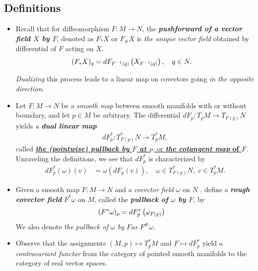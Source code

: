 \documentclass[11pt]{article}
\begin{document}
\subsection{Definitions}
\begin{itemize}
\item Recall that for diffeomorphism $F: M\rightarrow N$, the \emph{\textbf{pushforward of a vector field $X$ by $F$}}, denoted as $F_{*}X$ or $F_{\#}X$ is \emph{the unique vector field} obtained by differential of $F$ acting on $X$.  
\begin{align*}
(F_{*}X)_{q} &= dF_{F^{-1}(q)}\left(X_{F^{-1}(q)}\right), \quad q \in N.
\end{align*}

\emph{Dualizing} this process leads to a linear map on covectors going \emph{in the opposite direction}.

\item \begin{definition}
Let $F: M \rightarrow N$ be a \emph{smooth map} between smooth manifolds with or without boundary, and let $p \in M$ be arbitrary. The differential $dF_p: T_{p}M \rightarrow T_{F(p)}N$ yields \emph{a \textbf{dual linear map}}
\begin{align*}
dF_{p}^{*}:  T_{F(p)}^{*}N \rightarrow T_{p}^{*}M,
\end{align*} called \underline{\emph{\textbf{the (pointwise) pullback by $F$ at $p$}}, or \textbf{\emph{the cotangent map} of $F$}}. Unraveling
the definitions, we see that $dF_{p}^{*}$ is characterized by
\begin{align*}
dF_{p}^{*}(\omega)(v) &= \omega(dF_{p}(v)), \quad  \omega \in T_{F(p)}^{*}N, \; v \in T_{p}^{*}M.
\end{align*}
\end{definition}

\item \begin{definition}
Given a smooth map $F: M \rightarrow N$ and a \emph{covector field} $\omega$ on $N$ , define a \emph{\textbf{rough covector field}} $F^{*}\omega$ on $M$, called the
\textbf{\emph{pullback of $\omega$ by $F$}}, by
\begin{align*}
(F^{*}\omega)_p &= dF_{p}^{*}\left(\omega_{F(p)}\right)
\end{align*}  We also denote \emph{the pullback of $\omega$ by $F$as $F^{\#}\omega$}.
\end{definition}

\item \begin{remark}
Observe that the assignments $(M, p)\mapsto T_{p}^{*}M$ and $F \mapsto dF_{p}^{*}$ yield a \emph{contravariant functor} from the category of pointed smooth manifolds to the category of real vector spaces. 
\end{remark}


\end{itemize}
\end{document}
